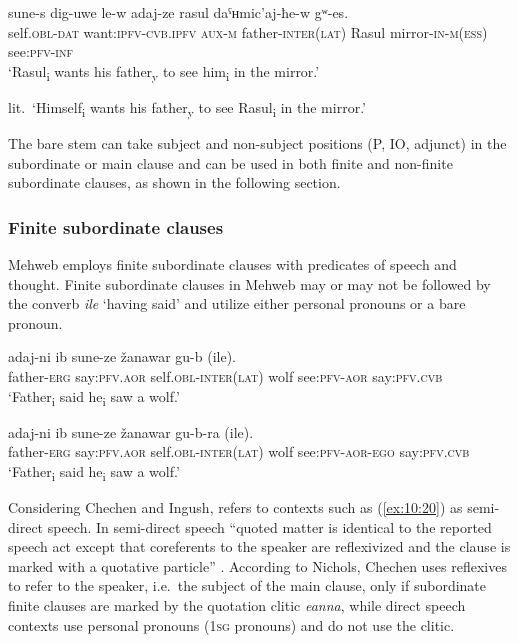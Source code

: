 ﻿\documentclass[output=paper]{langsci/langscibook}
\begin{document}
\ea \label{ex:10:18} %
\gll  sune-s dig-uwe le-w adaj-ze rasul daˤʜmic'aj-ħe-w gʷ-es.\\
self.\textsc{obl}-\textsc{dat} want:\textsc{ipfv}-\textsc{cvb.ipfv} \textsc{aux}-\textsc{m} father-\textsc{inter}(\textsc{lat}) Rasul mirror-\textsc{in}-\textsc{m}(\textsc{ess}) see:\textsc{pfv}-\textsc{inf}\\ 
\glt `Rasul\textsubscript{i} wants his father\textsubscript{y} to see
him\textsubscript{i} in the mirror.'

lit.\ `Himself\textsubscript{i} wants his father\textsubscript{y} to see
Rasul\textsubscript{i} in the mirror.'
\z

The bare stem can take subject and non-subject positions (P, IO,
adjunct) in the subordinate or main clause and can be used in both
finite and non-finite subordinate clauses, as shown in the following
section.

\subsubsection{Finite subordinate clauses}

Mehweb employs finite subordinate clauses with predicates of speech and
thought. Finite subordinate clauses in Mehweb may or may not be followed
by the converb \emph{ile} `having said' and utilize either personal
pronouns or a bare pronoun.

\ea \label{ex:10:19} %
\gll  adaj-ni ib sune-ze žanawar gu-b (ile).\\
father-\textsc{erg} say:\textsc{pfv}.\textsc{aor} self.\textsc{obl}-\textsc{inter}(\textsc{lat}) wolf see:\textsc{pfv}-\textsc{aor} say:\textsc{pfv}.\textsc{cvb}\\
\glt `Father\textsubscript{i} said he\textsubscript{i} saw a wolf.'

\ex \label{ex:10:20} %
\gll  adaj-ni ib sune-ze žanawar gu-b-ra (ile).\\
father-\textsc{erg} say:\textsc{pfv}.\textsc{aor} self.\textsc{obl}-\textsc{inter}(\textsc{lat}) wolf see:\textsc{pfv}-\textsc{aor}-\textsc{ego} say:\textsc{pfv}.\textsc{cvb}\\ 
\glt `Father\textsubscript{i} said he\textsubscript{i} saw a wolf.'
\z

Considering Chechen and Ingush, \citet{nichols2000} refers to 
contexts such as (\ref{ex:10:20}) as semi-direct speech. In semi-direct speech ``quoted
matter is identical to the reported speech act except that coreferents
to the speaker are reflexivized and the clause is marked with a
quotative particle'' \citep{nichols2000}. According to Nichols, Chechen
uses reflexives to refer to the speaker, i.e.\ the subject of the main
clause, only if subordinate finite clauses are marked by the quotation clitic
\emph{eanna}, while direct speech contexts use personal pronouns
(1\textsc{sg} pronouns) and do not use the clitic.
\end{document}

